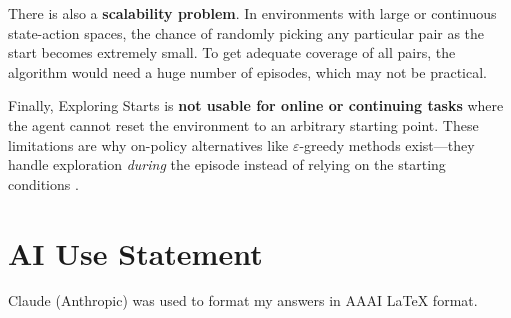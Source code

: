 \documentclass[letterpaper]{article}
\begin{document}
There is also a \textbf{scalability problem}. In environments with large or continuous state-action spaces, the chance of randomly picking any particular pair as the start becomes extremely small. To get adequate coverage of all pairs, the algorithm would need a huge number of episodes, which may not be practical.

Finally, Exploring Starts is \textbf{not usable for online or continuing tasks} where the agent cannot reset the environment to an arbitrary starting point. These limitations are why on-policy alternatives like $\varepsilon$-greedy methods exist---they handle exploration \textit{during} the episode instead of relying on the starting conditions \citep{sutton2018reinforcement}.

\section*{AI Use Statement}

Claude (Anthropic) was used to format my answers in AAAI LaTeX format.


\end{document}
